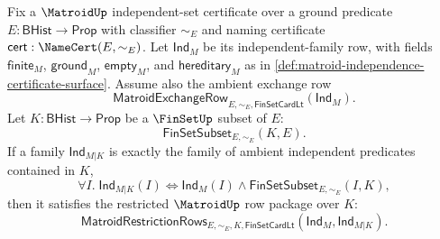\begin{theorem}
\label{thm:matroid-restriction-certificate}
Fix a $\MatroidUp$ independent-set certificate over a ground predicate $E:\mathsf{BHist}\to\mathsf{Prop}$ with classifier $\sim_E$ and naming certificate $\mathsf{cert}:\NameCert(E,\sim_E)$. Let $\mathsf{Ind}_M$ be its independent-family row, with fields $\mathsf{finite}_M$, $\mathsf{ground}_M$, $\mathsf{empty}_M$, and $\mathsf{hereditary}_M$ as in \autoref{def:matroid-independence-certificate-surface}. Assume also the ambient exchange row
$$
\mathsf{MatroidExchangeRow}_{E,\sim_E,\mathsf{FinSetCardLt}}(\mathsf{Ind}_M).
$$
Let $K:\mathsf{BHist}\to\mathsf{Prop}$ be a $\FinSetUp$ subset of $E$:
$$
\mathsf{FinSetSubset}_{E,\sim_E}(K,E).
$$
If a family $\mathsf{Ind}_{M|K}$ is exactly the family of ambient independent predicates contained in $K$,
$$
\forall I.\;
\mathsf{Ind}_{M|K}(I)\Longleftrightarrow
\mathsf{Ind}_M(I)\land
\mathsf{FinSetSubset}_{E,\sim_E}(I,K),
$$
then it satisfies the restricted $\MatroidUp$ row package over $K$:
$$
\mathsf{MatroidRestrictionRows}_{E,\sim_E,K,\mathsf{FinSetCardLt}}(\mathsf{Ind}_M,\mathsf{Ind}_{M|K}).
$$
\end{theorem}
